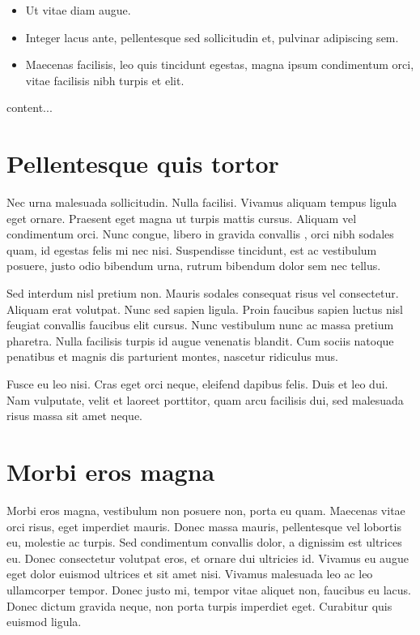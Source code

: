 \documentclass[a4paper,UKenglish,cleveref, autoref, thm-restate]{lipics-v2021}
\begin{document}
\begin{itemize}
\item Ut vitae diam augue.
\item Integer lacus ante, pellentesque sed sollicitudin et, pulvinar adipiscing sem.
\item Maecenas facilisis, leo quis tincidunt egestas, magna ipsum condimentum orci, vitae facilisis nibh turpis et elit.
\end{itemize}

\begin{remark}
content...
\end{remark}

\section{Pellentesque quis tortor}

Nec urna malesuada sollicitudin. Nulla facilisi. Vivamus aliquam tempus ligula eget ornare. Praesent eget magna ut turpis mattis cursus. Aliquam vel condimentum orci. Nunc congue, libero in gravida convallis \cite{DBLP:conf/focs/HopcroftPV75}, orci nibh sodales quam, id egestas felis mi nec nisi. Suspendisse tincidunt, est ac vestibulum posuere, justo odio bibendum urna, rutrum bibendum dolor sem nec tellus.

\begin{lemma} 
Sed interdum nisl pretium non. Mauris sodales consequat risus vel consectetur. Aliquam erat volutpat. Nunc sed sapien ligula. Proin faucibus sapien luctus nisl feugiat convallis faucibus elit cursus. Nunc vestibulum nunc ac massa pretium pharetra. Nulla facilisis turpis id augue venenatis blandit. Cum sociis natoque penatibus et magnis dis parturient montes, nascetur ridiculus mus.
\end{lemma}

Fusce eu leo nisi. Cras eget orci neque, eleifend dapibus felis. Duis et leo dui. Nam vulputate, velit et laoreet porttitor, quam arcu facilisis dui, sed malesuada risus massa sit amet neque.

\section{Morbi eros magna}

Morbi eros magna, vestibulum non posuere non, porta eu quam. Maecenas vitae orci risus, eget imperdiet mauris. Donec massa mauris, pellentesque vel lobortis eu, molestie ac turpis. Sed condimentum convallis dolor, a dignissim est ultrices eu. Donec consectetur volutpat eros, et ornare dui ultricies id. Vivamus eu augue eget dolor euismod ultrices et sit amet nisi. Vivamus malesuada leo ac leo ullamcorper tempor. Donec justo mi, tempor vitae aliquet non, faucibus eu lacus. Donec dictum gravida neque, non porta turpis imperdiet eget. Curabitur quis euismod ligula.
\end{document}
